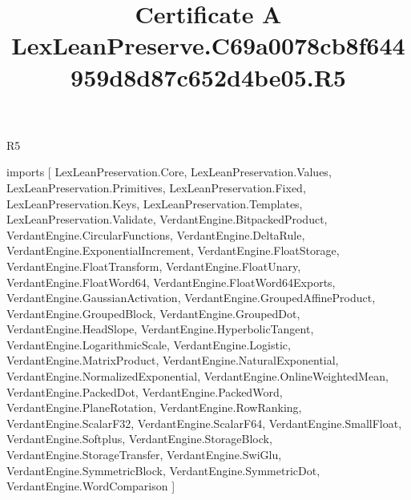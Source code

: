 \begin{lexlean}{R5}
\title{Certificate A LexLeanPreserve.C69a0078cb8f644959d8d87c652d4be05.R5}
\begin{coremodule}
imports [
  LexLeanPreservation.Core,
  LexLeanPreservation.Values,
  LexLeanPreservation.Primitives,
  LexLeanPreservation.Fixed,
  LexLeanPreservation.Keys,
  LexLeanPreservation.Templates,
  LexLeanPreservation.Validate,
  VerdantEngine.BitpackedProduct,
  VerdantEngine.CircularFunctions,
  VerdantEngine.DeltaRule,
  VerdantEngine.ExponentialIncrement,
  VerdantEngine.FloatStorage,
  VerdantEngine.FloatTransform,
  VerdantEngine.FloatUnary,
  VerdantEngine.FloatWord64,
  VerdantEngine.FloatWord64Exports,
  VerdantEngine.GaussianActivation,
  VerdantEngine.GroupedAffineProduct,
  VerdantEngine.GroupedBlock,
  VerdantEngine.GroupedDot,
  VerdantEngine.HeadSlope,
  VerdantEngine.HyperbolicTangent,
  VerdantEngine.LogarithmicScale,
  VerdantEngine.Logistic,
  VerdantEngine.MatrixProduct,
  VerdantEngine.NaturalExponential,
  VerdantEngine.NormalizedExponential,
  VerdantEngine.OnlineWeightedMean,
  VerdantEngine.PackedDot,
  VerdantEngine.PackedWord,
  VerdantEngine.PlaneRotation,
  VerdantEngine.RowRanking,
  VerdantEngine.ScalarF32,
  VerdantEngine.ScalarF64,
  VerdantEngine.SmallFloat,
  VerdantEngine.Softplus,
  VerdantEngine.StorageBlock,
  VerdantEngine.StorageTransfer,
  VerdantEngine.SwiGlu,
  VerdantEngine.SymmetricBlock,
  VerdantEngine.SymmetricDot,
  VerdantEngine.WordComparison
]


\end{coremodule}
\end{lexlean}
